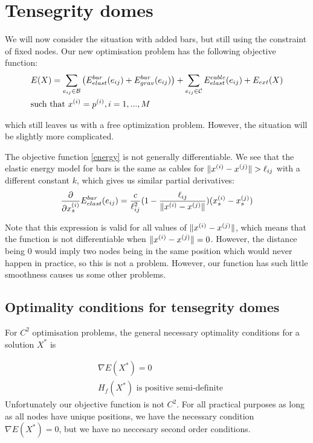 \section{Tensegrity domes}
We will now consider the situation with added bars, but still using the constraint of fixed nodes. Our new optimisation problem has the following objective function:
\begin{equation}
\begin{aligned}
    \label{energy}
    &E(X) = \sum\limits_{e_{ij} \in \mathcal{B}}\big(E^{bar}_{elast}(e_{ij}) + E^{bar}_{grav}(e_{ij})\big) + \sum\limits_{e_{ij} \in \mathcal{C}} E^{cable}_{elast}(e_{ij}) + E_{ext}(X) \\
    & \text{such that } x^{(i)} = p^{(i)}, i=1,...,M
\end{aligned}
\end{equation}

which still leaves us with a free optimization problem. However, the situation will be slightly more complicated.

The objective function \eqref{energy} is not generally differentiable. We see that the elastic energy model for bars is the same as cables for $\lVert x^{(i)} - x^{(j)}\rVert > \ell_{ij}$ with a different constant $k$, which gives us similar partial derivatives:
\begin{equation*}
\frac{\partial}{\partial x_s^{(i)}} E^{bar}_{elast}(e_{ij}) = \frac{c}{\ell_{ij}^2} (1- \frac{\ell_{ij}}{\lVert x^{(i)} - x^{(j)}\rVert}) (x_s^{(i)} - x_s^{(j)})
\end{equation*}

Note that this expression is valid for all values of $\lVert x^{(i)} - x^{(j)}\rVert$, which means that the function is not differentiable when $\lVert x^{(i)} - x^{(j)}\rVert = 0$. However, the distance being $0$ would imply two nodes being in the same position which would never happen in practice, so this is not a problem. However, our function has such little smoothness causes us some other problems.

\subsection{Optimality conditions for tensegrity domes}
For $C^2$ optimisation problems, the general necessary optimality conditions for a solution $X^*$ is

\begin{align*}
    &\nabla E(X^*) = 0\\
    & H_f(X^*) \text{ is positive semi-definite}
\end{align*}
Unfortunately our objective function is not $C^2$. For all practical purposes as long as all nodes have unique positions, we have the necessary condition $\nabla E(X^*) = 0$,  but we have no neccesary second order conditions.

